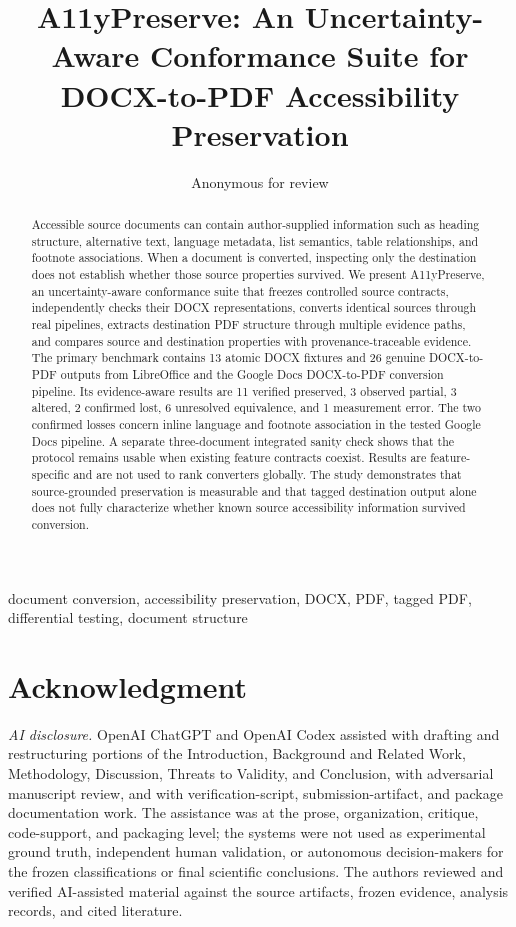 \documentclass[conference]{IEEEtran}
\title{A11yPreserve: An Uncertainty-Aware Conformance Suite for DOCX-to-PDF Accessibility Preservation}
\author{Anonymous for review}
\begin{document}
\maketitle

\begin{abstract}
Accessible source documents can contain author-supplied information such as heading structure, alternative text, language metadata, list semantics, table relationships, and footnote associations. When a document is converted, inspecting only the destination does not establish whether those source properties survived. We present A11yPreserve, an uncertainty-aware conformance suite that freezes controlled source contracts, independently checks their DOCX representations, converts identical sources through real pipelines, extracts destination PDF structure through multiple evidence paths, and compares source and destination properties with provenance-traceable evidence. The primary benchmark contains 13 atomic DOCX fixtures and 26 genuine DOCX-to-PDF outputs from LibreOffice and the Google Docs DOCX-to-PDF conversion pipeline. Its evidence-aware results are 11 verified preserved, 3 observed partial, 3 altered, 2 confirmed lost, 6 unresolved equivalence, and 1 measurement error. The two confirmed losses concern inline language and footnote association in the tested Google Docs pipeline. A separate three-document integrated sanity check shows that the protocol remains usable when existing feature contracts coexist. Results are feature-specific and are not used to rank converters globally. The study demonstrates that source-grounded preservation is measurable and that tagged destination output alone does not fully characterize whether known source accessibility information survived conversion.
\end{abstract}

\begin{IEEEkeywords}
document conversion, accessibility preservation, DOCX, PDF, tagged PDF, differential testing, document structure
\end{IEEEkeywords}










\section*{Acknowledgment}
\textit{AI disclosure.} OpenAI ChatGPT and OpenAI Codex assisted with drafting and restructuring portions of the Introduction, Background and Related Work, Methodology, Discussion, Threats to Validity, and Conclusion, with adversarial manuscript review, and with verification-script, submission-artifact, and package documentation work. The assistance was at the prose, organization, critique, code-support, and packaging level; the systems were not used as experimental ground truth, independent human validation, or autonomous decision-makers for the frozen classifications or final scientific conclusions. The authors reviewed and verified AI-assisted material against the source artifacts, frozen evidence, analysis records, and cited literature.



\end{document}
